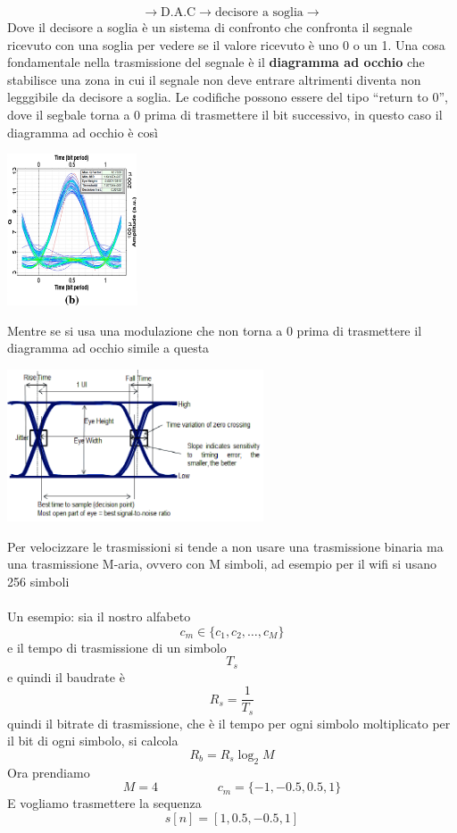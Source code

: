 \documentclass{article}
\newcommand{\accapo}{\\\hspace*{1cm}\\}
\newcommand{\vopen}{``}
\newcommand{\vclose}{''}
\begin{document}
\[\to\boxed{\text{D.A.C}}\to\boxed{\text{decisore a soglia}}\to\]
Dove il decisore a soglia è un sistema di confronto che confronta il segnale ricevuto con una soglia per vedere se il valore ricevuto è uno 0 o un 1. Una cosa fondamentale nella trasmissione del segnale è il \textbf{diagramma ad occhio} che stabilisce una zona in cui il segnale non deve entrare altrimenti diventa non legggibile da decisore a soglia. Le codifiche possono essere del tipo \vopen return to 0\vclose, dove il segbale torna a 0 prima di trasmettere il bit successivo, in questo caso il diagramma ad occhio è così
\begin{center}
    \includegraphics[height=4.5cm]{images/eye diagram-2.png}
\end{center}
Mentre se si usa una modulazione che non torna a 0 prima di trasmettere il diagramma ad occhio simile a questa
\begin{center}
    \includegraphics[height=4.5cm]{images/eye diagram.png}
\end{center}
Per velocizzare le trasmissioni si tende a non usare una trasmissione binaria ma una trasmissione M-aria, ovvero con M simboli, ad esempio per il wifi si usano 256 simboli
\accapo
Un esempio: sia il nostro alfabeto
\[c_m\in\{c_1,c_2,\dots,c_M\}\]
e il tempo di trasmissione di un simbolo
\[T_s\]
e quindi il baudrate è
\[R_s=\frac{1}{T_s}\]
quindi il bitrate di trasmissione, che è il tempo per ogni simbolo moltiplicato per il bit di ogni simbolo, si calcola
\[R_b=R_s\log_{2}M\]
Ora prendiamo
\[M=4\hspace{2cm} c_m=\{-1,-0.5,0.5,1\}\]
E vogliamo trasmettere la sequenza
\[s[n]=[1,0.5,-0.5,1]\]
\end{document}
